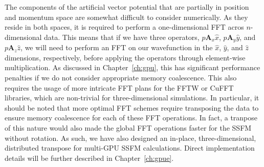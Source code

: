 The components of the artificial vector potential that are partially in position and momentum space are somewhat difficult to consider numerically.
As they reside in both spaces, it is required to perform a one-dimensional FFT acros $n$-dimensional data.
This means that if we have three operators, $p\mathbf{A}_x \hat x$, $p\mathbf{A}_y \hat y$, and $p\mathbf{A}_z \hat z$, we will need to perform an FFT on our wavefunction in the $\hat x$, $\hat y$, and $\hat z$ dimensions, respectively, before applying the operators through element-wise multiplication. 
As discussed in Chapter~\ref{ch:gpu}, this has significant performance penalties if we do not consider appropriate memory coalescence.
This also requires the usage of more intricate FFT plans for the FFTW or CuFFT libraries, which are non-trivial for three-dimensional simulations.
In particular, it should be noted that more optimal FFT schemes require transposing the data to ensure memory coalescence for each of these FFT operations.
In fact, a tranpose of this nature would also made the global FFT operations faster for the SSFM without rotation.
As such, we have also designed an in-place, three-dimensional, distributed transpose for multi-GPU SSFM calculations.
Direct implementation details will be further described in Chapter~\ref{ch:gpue}.
